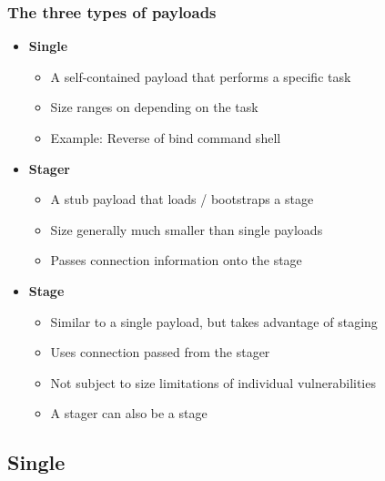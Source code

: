 \documentclass{beamer}
\newenvironment{sitemize}{\vspace{1mm}\begin{itemize}\itemsep 4pt\small}{\end{itemize}}
\begin{document}
\begin{frame}[t]
    \frametitle{The three types of payloads}

    \begin{sitemize}
        \item \textbf{Single}
        \begin{sitemize}
            \item A self-contained payload that performs a specific
            task
            \item Size ranges on depending on the task
	    \item Example: Reverse of bind command shell
        \end{sitemize}

        \pause
        \item \textbf{Stager}
        \begin{sitemize}
            \item A stub payload that loads / bootstraps a stage
            \item Size generally much smaller than single payloads
            \item Passes connection information onto the stage
        \end{sitemize}

        \pause
        \item \textbf{Stage}
        \begin{sitemize}
            \item Similar to a single payload, but takes advantage
            of staging
            \item Uses connection passed from the stager
            \item Not subject to size limitations of individual
            vulnerabilities
	    \item A stager can also be a stage
        \end{sitemize}
    \end{sitemize}
\end{frame}

\subsection{Single}
\end{document}
